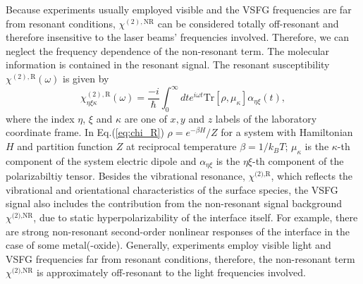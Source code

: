 %
Because experiments usually employed visible and the VSFG frequencies are far from resonant 
conditions, $\chi^{(2),\text{NR}}$ can be considered totally off-resonant and therefore 
insensitive to the laser beams' frequencies involved. Therefore, we can neglect the 
frequency dependence of the non-resonant term.
The molecular information is contained in the resonant signal. The resonant susceptibility $\chi^{(2),\text{R}}(\omega)$ is given by 
\begin{equation}
  \chi_{\eta\xi\kappa}^{(2),\text{R}}(\omega)=\frac{-i}{\hbar}\int_0^\infty dt e^{i\omega t} \text{Tr}{[\rho,\mu_\kappa]\alpha_{\eta\xi}(t)},
\label{eq:chi_R}
\end{equation}
where the index $\eta$, $\xi$ and $\kappa$ are one of $x, y$ and $z$ labels of the laboratory coordinate frame.
In Eq.\thinspace(\ref{eq:chi_R}) $\rho=e^{-\beta H}/Z$ for a system with Hamiltonian $H$ and partition function $Z$ at reciprocal temperature $\beta=1/k_BT$;
$\mu_\kappa$ is the $\kappa$-th component of the system electric dipole and ${\alpha_{\eta\xi}}$ is the $\eta\xi$-th component of the polarizabiltiy tensor\cite{1995SM}.
Besides the vibrational resonance, $\chi^{\text{(2),R}}$, which reflects the vibrational and orientational characteristics of the surface species, 
the VSFG signal also includes the contribution from the non-resonant signal background $\chi^{\text{(2),NR}}$, 
due to static hyperpolarizability of the interface itself\cite{Che2012}.  
For example, there are strong non-resonant second-order nonlinear responses \cite{Pradier11,Vanselow2012,Wieckowski99} of the interface in the case of some metal(-oxide). 
Generally, experiments employ visible light and VSFG frequencies far from resonant conditions, therefore, the non-resonant 
term $\chi^{\text{(2),NR}}$ is approximately off-resonant to the light frequencies involved\cite{Morita02}.

